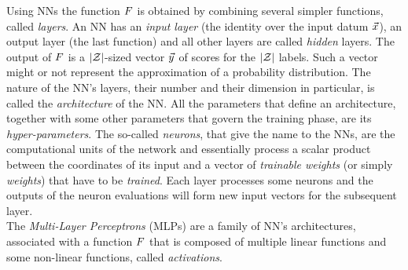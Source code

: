 Using NNs the function $F$ is obtained by combining several simpler functions, called \emph{layers}. An NN has an \emph{input layer} (the identity over the input datum $\vec{x}$), an output layer (the last function) and all other layers are called \emph{hidden} layers.  The output of $F$ is a $\lvert\mathcal{Z}\rvert$-sized vector $\vec{y}$ of scores for the $\lvert\mathcal{Z}\rvert$ labels. Such a vector might or not represent the approximation of a probability distribution. The nature of the NN's  layers, their number and their dimension in particular, is called the \emph{architecture} of the NN. All the parameters that define an architecture, together with some other parameters that govern the training phase, are its \emph{hyper-parameters}. The so-called \emph{neurons}, that give the name to the NNs, are the computational units of the network and essentially process a scalar product between the coordinates of its input and a vector of  \emph{trainable weights} (or simply \emph{weights}) that have to be \emph{trained}. Each layer processes some neurons and the outputs of the neuron evaluations will form new input vectors for the subsequent layer. \\

The {\em Multi-Layer Perceptrons} (MLPs) are a family of NN's architectures, associated with a function $F$  that is composed of multiple linear functions and some non-linear functions, called {\em activations}. \\

